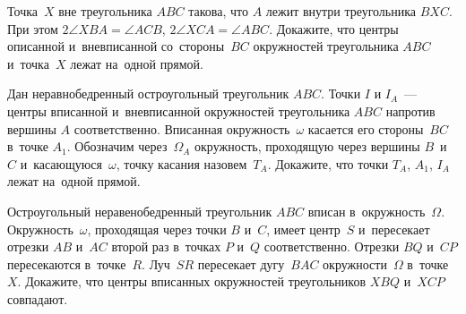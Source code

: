 \begin{problems}

\item
Точка~$X$ вне треугольника $ABC$ такова, что $A$ лежит внутри
треугольника $BXC$.
При этом $2 \angle XBA = \angle ACB$, $2 \angle XCA = \angle ABC$.
Докажите, что центры описанной и~вневписанной со~стороны~$BC$ окружностей
треугольника $ABC$ и~точка~$X$ лежат на~одной прямой.

\item
Дан неравнобедренный остроугольный треугольник $ABC$.
Точки $I$ и $I_{A}$~--- центры вписанной и~вневписанной окружностей
треугольника $ABC$ напротив вершины $A$ соответственно.
Вписанная окружность~$\omega$ касается его стороны~$BC$ в~точке $A_{1}$.
Обозначим через~$\Omega_{A}$ окружность, проходящую через вершины $B$~и~$C$
и~касающуюся~$\omega$, точку касания назовем~$T_{A}$.
Докажите, что точки $T_{A}$, $A_{1}$, $I_{A}$ лежат на~одной прямой.

\item
Остроугольный неравенобедренный треугольник $ABC$ вписан в~окружность~$\Omega$.
Окружность~$\omega$, проходящая через точки $B$ и~$C$, имеет центр~$S$
и~пересекает отрезки $AB$ и~$AC$ второй раз в~точках $P$ и~$Q$ соответственно.
Отрезки $BQ$ и~$CP$ пересекаются в~точке~$R$.
Луч~$SR$ пересекает дугу~$BAC$ окружности~$\Omega$ в~точке~$X$.
Докажите, что центры вписанных окружностей треугольников $XBQ$ и~$XCP$
совпадают.

\end{problems}

